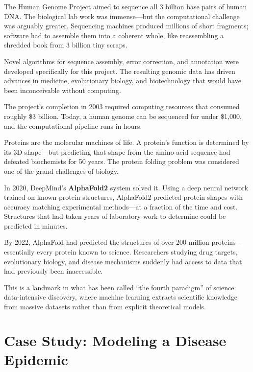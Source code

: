 \documentclass[11pt,letterpaper]{article}
\begin{document}
\begin{historybox}
The Human Genome Project aimed to sequence all 3 billion base pairs of human DNA. The biological lab work was immense---but the computational challenge was arguably greater. Sequencing machines produced millions of short fragments; software had to assemble them into a coherent whole, like reassembling a shredded book from 3 billion tiny scraps.

Novel algorithms for sequence assembly, error correction, and annotation were developed specifically for this project. The resulting genomic data has driven advances in medicine, evolutionary biology, and biotechnology that would have been inconceivable without computing.

The project's completion in 2003 required computing resources that consumed roughly \$3 billion. Today, a human genome can be sequenced for under \$1,000, and the computational pipeline runs in hours.
\end{historybox}

\begin{historybox}
Proteins are the molecular machines of life. A protein's function is determined by its 3D shape---but predicting that shape from the amino acid sequence had defeated biochemists for 50 years. The protein folding problem was considered one of the grand challenges of biology.

In 2020, DeepMind's \textbf{AlphaFold2} system solved it. Using a deep neural network trained on known protein structures, AlphaFold2 predicted protein shapes with accuracy matching experimental methods---at a fraction of the time and cost. Structures that had taken years of laboratory work to determine could be predicted in minutes.

By 2022, AlphaFold had predicted the structures of over 200 million proteins---essentially every protein known to science. Researchers studying drug targets, evolutionary biology, and disease mechanisms suddenly had access to data that had previously been inaccessible.

This is a landmark in what has been called ``the fourth paradigm'' of science: data-intensive discovery, where machine learning extracts scientific knowledge from massive datasets rather than from explicit theoretical models.
\end{historybox}

\section{Case Study: Modeling a Disease Epidemic}
\end{document}

